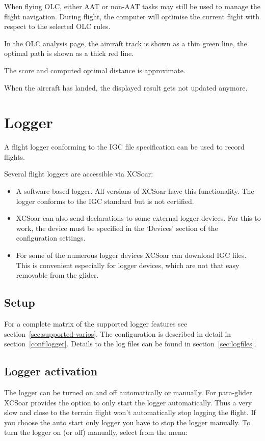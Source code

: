 When flying OLC, either AAT or non-AAT tasks may still be used to
manage the flight navigation.  During flight, the computer will optimise the
current flight with respect to the selected OLC rules.  

In the OLC analysis page, the aircraft track is shown as a thin green line, the optimal 
path is shown as a thick red line.

The score and computed optimal distance is approximate.

When the aircraft has landed, the displayed result gets not updated anymore.


\section{Logger}\label{sec:logger}

A flight logger conforming to the IGC file specification can be used
to record flights.  

Several flight loggers are accessible via XCSoar:
\begin{itemize}
\item A software-based logger.  All versions of XCSoar have this
  functionality.  The logger conforms to the IGC standard but is not
  certified.
\item XCSoar can also send declarations to some external logger devices. 
  For this to work, the device must be specified in the `Devices' 
  section of the configuration  settings.
\item  For some of the numerous logger devices XCSoar can download IGC files. 
  This is convenient especially for logger devices, which are not that easy 
  removable from the glider.
\end{itemize}

\subsection*{Setup}
For a complete matrix of the supported logger features see section~\ref{sec:supported-varios}.  
The configuration is described in detail in section~\ref{conf:logger}.  Details 
to the log files can be found in section~\ref{sec:logfiles}.

\subsection*{Logger activation}
The logger can be turned on and off automatically or manually.  For para-glider 
XCSoar provides the option to only start the logger automatically. Thus a very 
slow and close to the terrain flight won't automatically stop logging the flight. 
If you choose the auto start only logger you have to stop the logger manually.
To turn the logger on (or off) manually, select from the menu:
\begin{quote}
\blink{}
\end{quote}

